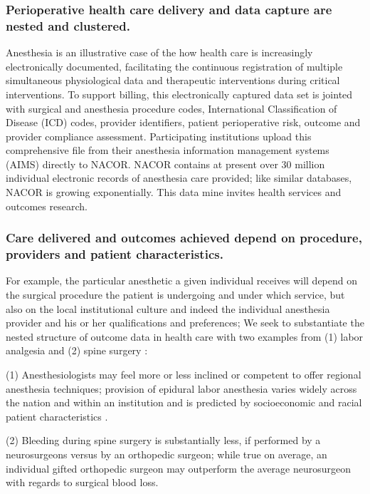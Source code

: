 \documentclass[11pt,notitlepage]{article}
\begin{document}
\subsubsection*{Perioperative health care delivery and data capture are nested and clustered.}
Anesthesia is an illustrative case of the how health care is increasingly electronically documented, facilitating the continuous registration of multiple simultaneous physiological   data and therapeutic interventions during critical interventions. To support billing, this electronically captured data set is jointed with surgical and anesthesia procedure codes, International Classification of Disease (ICD) codes, provider identifiers, patient perioperative risk, outcome and provider compliance assessment. Participating institutions upload this comprehensive file from their anesthesia information management systems (AIMS) directly to NACOR. NACOR contains at present over 30 million individual electronic records of anesthesia care provided; like similar databases, NACOR is growing exponentially. This data mine invites health services and outcomes research.

\subsubsection*{Care delivered and outcomes achieved depend on procedure, providers and patient characteristics.} For example, the particular anesthetic a given individual receives will depend on the surgical procedure the patient is undergoing and under which service, but also on the local institutional culture and indeed the individual anesthesia provider and his or her qualifications and preferences\cite{AndreaeWhite2015}; We seek to substantiate the nested structure of outcome data in health care with two examples from (1) labor analgesia and (2) spine surgery : 

(1) Anesthesiologists may feel more or less inclined or competent to offer regional anesthesia techniques; provision of epidural labor anesthesia varies widely across the nation and within an institution and is predicted by socioeconomic and racial patient characteristics \cite{Rust2004,Glance2007}.
 
(2) Bleeding during spine surgery is substantially less, if performed by a neurosurgeons versus by an orthopedic surgeon; while true on average, an individual gifted orthopedic surgeon may outperform the average neurosurgeon with regards to surgical blood loss.
\end{document}
